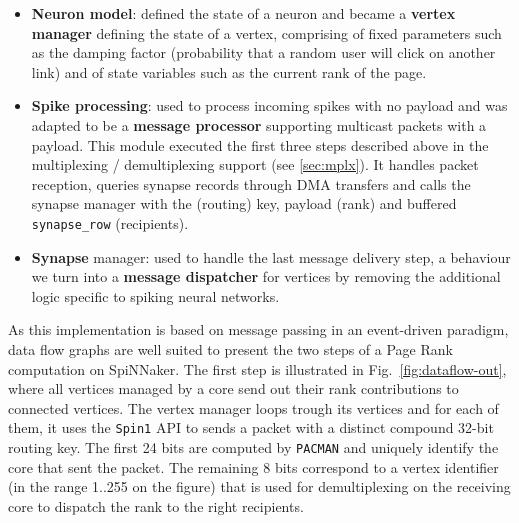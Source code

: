 \begin{itemize}
\item \textbf{Neuron model}: defined the state of a neuron and became a \textbf{vertex manager} defining the state of a vertex, comprising of fixed parameters such as the damping factor (probability that a random user will click on another link) and of state variables such as the current rank of the page.

\item \textbf{Spike processing}: used to process incoming spikes with no payload and was adapted to be a \textbf{message processor} supporting multicast packets with a payload. This module executed the first three steps described above in the multiplexing / demultiplexing support (see \ref{sec:mplx}). It handles packet reception, queries synapse records through DMA transfers and calls the synapse manager with the (routing) key, payload (rank) and buffered \texttt{synapse\_row} (recipients).

\item \textbf{Synapse} manager: used to handle the last message delivery step, a behaviour we turn into a \textbf{message dispatcher} for vertices by removing the additional logic specific to spiking neural networks.
\end{itemize}

As this implementation is based on message passing in an event-driven paradigm, data flow graphs are well suited to present the two steps of a Page Rank computation on SpiNNaker. The first step is illustrated in Fig.~\ref{fig:dataflow-out}, where all vertices managed by a core send out their rank contributions to connected vertices. The vertex manager loops trough its vertices and for each of them, it uses the \texttt{Spin1} API to sends a packet with a distinct compound 32-bit routing key. The first 24 bits are computed by \texttt{PACMAN} and uniquely identify the core that sent the packet. The remaining 8 bits correspond to a vertex identifier (in the range 1..255 on the figure) that is used for demultiplexing on the receiving core to dispatch the rank to the right recipients.

